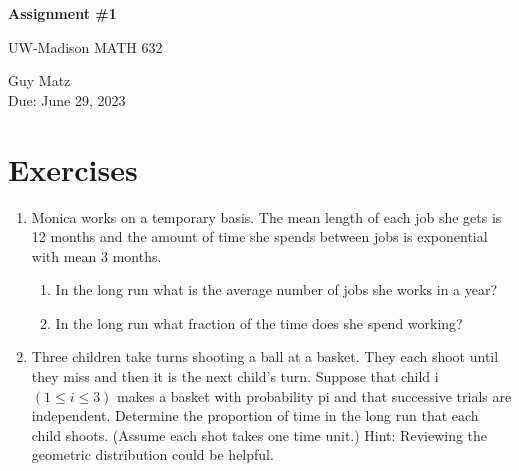 \documentclass{article} %
\theoremstyle{plain}
\theoremstyle{case}
\begin{document}
\begin{center}
\Large{\textbf{Assignment \#1}
            
UW-Madison MATH 632} %
\vspace{5pt}
        
\normalsize{  Guy Matz%
        \\ Due: June 29, 2023}
\vspace{15pt}
\end{center}

\section*{Exercises}%
\begin{enumerate}[label={\fbox{\textbf{Exercise \#\arabic* :}}}]
  \item Monica works on a temporary basis. The mean length of each job she
    gets is 12 months and the amount of time she spends between jobs
    is exponential with mean 3 months.
    \begin{enumerate}
      \item In the long run what is the average number of jobs she works in a year?
      \item  In the long run what fraction of the time does she spend working?
    \end{enumerate}
  \newpage
  \item Three children take turns shooting a ball at a basket. They each shoot until they miss and then
it is the next child’s turn. Suppose that child i $(1 \leq i \leq 3)$ makes a basket with probability pi
and that successive trials are independent. Determine the proportion of time in the long run
that each child shoots. (Assume each shot takes one time unit.)
Hint: Reviewing the geometric distribution could be helpful.


\end{enumerate}
\end{document}
